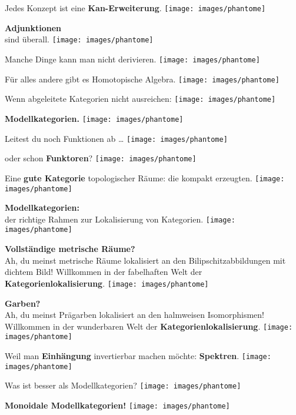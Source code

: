 \documentclass[a4paper,ngerman,landscape,30pt]{scrartcl}
\begin{document}
\newcommand{\page}[1]{
  \begin{center}
    \Huge\sffamily
    #1%
    \vfill
    \texttt{[image: images/phantome]}
  \end{center}
  \newpage
}

\page{Jedes Konzept ist eine \textbf{Kan-Erweiterung}.}

\page{\textbf{Adjunktionen} \\ sind überall.}

\page{Manche Dinge kann man nicht derivieren.}
\page{Für alles andere gibt es Homotopische Algebra.}

\page{Wenn abgeleitete Kategorien nicht ausreichen:}
\page{\textbf{Modellkategorien.}}

\page{Leitest du noch Funktionen ab \ldots}
\page{oder schon \textbf{Funktoren}?}

\page{
  Eine \textbf{gute Kategorie} topologischer Räume:
  die kompakt erzeugten.
}

\page{
  \textbf{Modellkategorien:} \\
  \huge
  der richtige Rahmen zur Lokalisierung von Kategorien.
}

\page{
  \textbf{Vollständige metrische Räume?} \\
  \large
  Ah, du meinst metrische Räume lokalisiert an den Bilipschitzabbildungen mit
  dichtem Bild!
  Willkommen in der fabelhaften Welt der \textbf{Kategorienlokalisierung}.
}

\page{
  \textbf{Garben?} \\
  \Large
  Ah, du meinst Prägarben lokalisiert an den halmweisen Isomorphismen! \\
  Willkommen in der wunderbaren Welt der \textbf{Kategorienlokalisierung}.
}

\page{
  Weil man \textbf{Einhängung} invertierbar machen möchte:
  \textbf{Spektren}.
}

\page{Was ist besser als Modellkategorien?}
\page{\textbf{Monoidale Modellkategorien!}}
\end{document}
